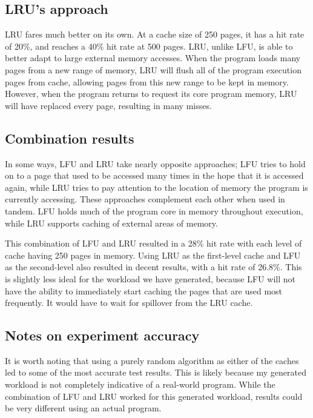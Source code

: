 \documentclass[paper=a4, fontsize=11pt]{scrartcl} %
\numberwithin{equation}{section} %
\numberwithin{figure}{section} %
\numberwithin{table}{section} %
\begin{document}
\subsection{LRU's approach}
LRU fares much better on its own. At a cache size of 250 pages, it has a hit rate of 20\%, and reaches a 40\% hit rate at 500 pages. LRU, unlike LFU, is able to better adapt to large external memory accesses. When the program loads many pages from a new range of memory, LRU will flush all of the program execution pages from cache, allowing pages from this new range to be kept in memory. However, when the program returns to request its core program memory, LRU will have replaced every page, resulting in many misses.

\subsection{Combination results}
In some ways, LFU and LRU take nearly opposite approaches; LFU tries to hold on to a page that used to be accessed many times in the hope that it is accessed again, while LRU tries to pay attention to the location of memory the program is currently accessing. These approaches complement each other when used in tandem. LFU holds much of the program core in memory throughout execution, while LRU supports caching of external areas of memory.

This combination of LFU and LRU resulted in a 28\% hit rate with each level of cache having 250 pages in memory. Using LRU as the first-level cache and LFU as the second-level also resulted in decent results, with a hit rate of 26.8\%. This is slightly less ideal for the workload we have generated, because LFU will not have the ability to immediately start caching the pages that are used most frequently. It would have to wait for spillover from the LRU cache.

\subsection{Notes on experiment accuracy}
It is worth noting that using a purely random algorithm as either of the caches led to some of the most accurate test results. This is likely because my generated workload is not completely indicative of a real-world program. While the combination of LFU and LRU worked for this generated workload, results could be very different using an actual program.

\pagebreak

\end{document}
